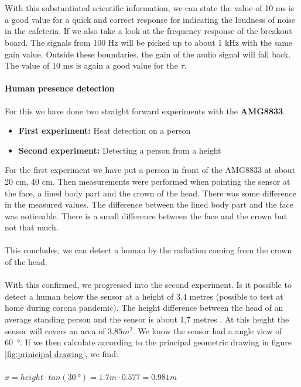 \documentclass[11pt,a4paper]{article}
\begin{document}
\\ \\ With this substantiated scientific information, we can state the value of 10 ms is a good value for a quick and correct response for indicating the loudness of noise in the cafeteria. If we also take a look at the frequency response of the breakout board. The signals from 100 Hz will be picked up to about 1 kHz with the same gain value. Outside these boundaries, the gain of the audio signal will fall back. The value of 10 ms is again a good value for the $\tau$.


\paragraph{Human presence detection}\label{sec:amg}
For this we have done two straight forward experiments with the \textbf{AMG8833}.
\begin{itemize}
\item \textbf{First experiment:} Heat detection on a person
\item \textbf{Second experiment:} Detecting a person from a height
\end{itemize}
For the first experiment we have put a person in front of the AMG8833 at about 20 cm, 40 cm. Then measurements were performed when pointing the sensor at the face, a lined body part and the crown of the head. There was some difference in the measured values. The  difference between the lined body part and the face was noticeable. There is a small difference between the face and the crown but not that much. 
\\ \\ 
This concludes, we can detect a human by the radiation coming from the crown of the head.
\\ \\
With this confirmed, we progressed into the second experiment. Is it possible to detect a human below the sensor at a height of 3,4 metres (possible to test at home during corona pandemic). The height difference between the head of an average standing person and the sensor is about 1,7 metres \cite{average_height}. At this height the sensor will covers an area of $3.85 m^2$. We know the sensor had a angle view of \SI{60}{\degree}. If we then calculate according to the principal geometric drawing in figure \ref{fig:prinicipal drawing},  we find:
\\ \\
$ x = height \cdot tan (\SI{30}{\degree}) = 1.7 m \cdot 0.577 = 0.981 m$
\\ \\
\end{document}
